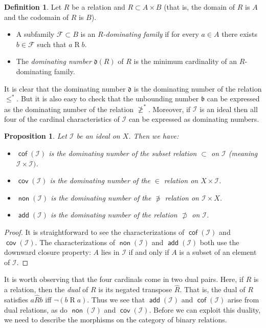 \documentclass[11pt,oneside]{amsbook}
\DeclareMathOperator{\add}{\mathsf{add}}
\DeclareMathOperator{\non}{\mathsf{non}}
\DeclareMathOperator{\cov}{\mathsf{cov}}
\DeclareMathOperator{\cof}{\mathsf{cof}}
\theoremstyle{definition}
\theoremstyle{plain}
\newtheorem{prop}[thm]{Proposition}
\theoremstyle{definition}
\newtheorem{defn}[thm]{Definition}
\theoremstyle{remark}
\numberwithin{equation}{section}
\numberwithin{figure}{section}
\begin{document}
\begin{defn}
  Let $R$ be a relation and $R\subset A\times B$ (that is, the domain of $R$ is $A$ and the codomain of $R$ is $B$).
  \begin{itemize}
  \item A subfamily $\mathcal F\subset B$ is an \emph{$R$-dominating family} if for every $a\in A$ there exists $b\in\mathcal F$ such that $a\mathrel{R}b$.
  \item The \emph{dominating number} $\mathfrak d(R)$ of $R$ is the minimum cardinality of an $R$-dominating family.
  \end{itemize}
\end{defn}

It is clear that the dominating number $\mathfrak d$ is the dominating number of the relation $\leq^*$. But it is also easy to check that the unbounding number $\mathfrak b$ can be expressed as the dominating number of the relation $\not\geq^*$. Moreover, if $\mathcal I$ is an ideal then all four of the cardinal characteristics of $\mathcal I$ can be expressed as dominating numbers.

\begin{prop}
  Let $\mathcal I$ be an ideal on $X$. Then we have:
  \begin{itemize}
  \item $\cof(\mathcal I)$ is the dominating number of the subset relation $\subset$ on $\mathcal I$ (meaning $\mathcal I\times\mathcal I)$.
  \item $\cov(\mathcal I)$ is the dominating number of the $\in$ relation on $X\times\mathcal I$.
  \item $\non(\mathcal I)$ is the dominating number of the $\not\ni$ relation on $\mathcal I\times X$.
  \item $\add(\mathcal I)$ is the dominating number of the relation $\not\supset$ on $\mathcal I$.
  \end{itemize}
\end{prop}

\begin{proof}
  It is straightforward to see the characterizations of $\cof(\mathcal I)$ and $\cov(\mathcal I)$. The characterizations of $\non(\mathcal I)$ and $\add(\mathcal I)$ both use the downward closure property: $A$ lies in $\mathcal I$ if and only if $A$ is a subset of an element of $\mathcal I$.
\end{proof}

It is worth observing that the four cardinals come in two dual pairs. Here, if $R$ is a relation, then the \emph{dual} of $R$ is its negated transpose $\hat{R}$. That is, the dual of $R$ satisfies $a\mathrel{\hat{R}}b$ iff $\neg(b\mathrel Ra)$. Thus we see that $\add(\mathcal I)$ and $\cof(\mathcal I)$ arise from dual relations, as do $\non(\mathcal I)$ and $\cov(\mathcal I)$. Before we can exploit this duality, we need to describe the morphisms on the category of binary relations.
\end{document}
